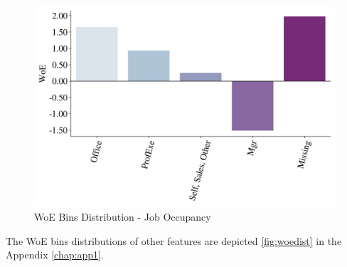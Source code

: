 \begin{figure}[H]
    \centering
    \caption{WoE Bins Distribution - Job Occupancy}\vspace{0.5em}
    \label{fig:woedistjob}
    \includegraphics[width=120mm]{Figures/WoE_Distribution_JOB.jpg}
    
    \vspace{-1em}
\end{figure}

The WoE bins distributions of other features are depicted \autoref{fig:woedist} in the Appendix \autoref{chap:app1}.



\newpage
